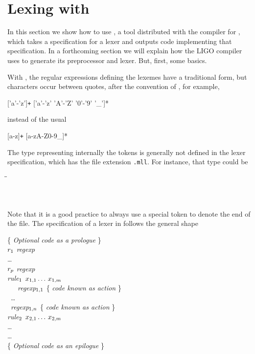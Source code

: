 \documentclass[12pt,a4paper]{article}
\begin{document}
\section{Lexing with \ocamllex}

In this section we show how to use \ocamllex, a tool distributed with
the compiler for \OCaml, which takes a specification for a lexer and
outputs \OCaml code implementing that specification. In a forthcoming
section we will explain how the LIGO compiler uses \ocamllex to
generate its preprocessor and lexer. But, first, some basics.

With \ocamllex, the regular expressions defining the lexemes have a
traditional form, but characters occur between quotes, after the
convention of \OCaml, for example,
\begin{center}
  \textsf{['a'-'z']\texttt{+} ['a'-'z' 'A'-'Z' '0'-'9' '\_']*}
\end{center}
instead of the usual
\begin{center}
  \textsf{[a-z]\texttt{+} [a-zA-Z0-9\_]*}
\end{center}
The \OCaml type representing internally the tokens is generally not
defined in the lexer specification, which has the file extension
\texttt{.mll}. For instance, that type could be
\begin{tabbing}
 \Xtype {} \= \equal \= \Tint \Xof {} \vbar{}
 \Tident \Xof {} \vbar{} \Ttrue \vbar{} \Tfalse\\
 \> \vbar \> \Tplus \vbar{} \Tminus \vbar{} \Ttimes \vbar{} \Tslash
 \vbar{} \Tequal \vbar{} \Tarrow\\
 \> \vbar \> \Tlpar \vbar{} \Trpar \vbar{} \Tlet \vbar{} \Tin \vbar{} \Trec\\
 \> \vbar \> \Tfun \vbar{}
 \Tif \vbar{} \Tthen \vbar{} \Telse \vbar{} \Tand \vbar{} \Tor \vbar{}
 \Tnot \vbar{} \Teof
\end{tabbing}
Note that it is a good practice to always use a special token \Teof to
denote the end of the file. The specification of a lexer in \ocamllex
follows the general shape
\begin{tabbing}
\{ \emph{Optional \OCaml code as a prologue} \}\\
\Xlet \(r\sb{1}\) \equal \emph{regexp}\\
\ldots\\
\Xlet \(r\sb{p}\) \equal \emph{regexp}\\
\Xrule \= \emph{rule}\(\sb{1}\) \(x\sb{1,1} \dots\, x\sb{1,m}\) \equal \Xparse\\
\> \ \ \ \emph{regexp}\(\sb{1,1}\) \{ \emph{\OCaml code known as
  \emph{action}} \}\\
\> \vbar{} \ \ldots\\
\> \vbar{} \ \emph{regexp}\(\sb{1,n}\) \{ \emph{\OCaml code known as \emph{action}} \}\\
\Xand \= \emph{rule}\(\sb{2}\) \(x\sb{2,1} \dots\, x\sb{2,m}\) \equal \Xparse\\
\> \ldots\\
\Xand \ldots\\
\{ \emph{Optional \OCaml code as an epilogue} \}
\end{tabbing}
\end{document}
